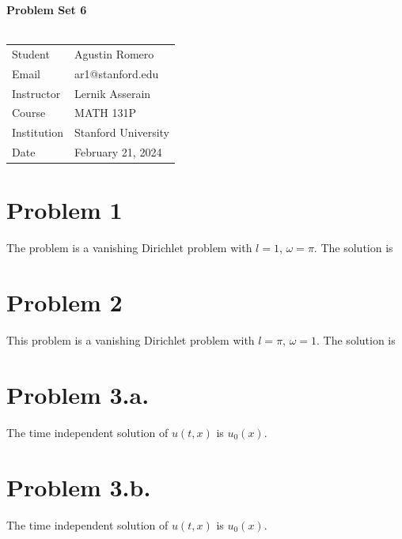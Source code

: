 \documentclass{article}
\begin{document}
\begin{center}
\textbf{\Large{Problem Set 6}}\\~\\
\begin{tabular}{l l}
Student&Agustin Romero\\
Email&ar1@stanford.edu\\
Instructor&Lernik Asserain\\
Course&MATH 131P\\
Institution&Stanford University\\
Date&February 21, 2024\\
\end{tabular}
\end{center}
\section*{Problem 1}
The problem is a vanishing Dirichlet problem with $l=1$, $\omega=\pi$.
The solution is
\section*{Problem 2}
This problem is a vanishing Dirichlet problem with $l=\pi$, $\omega=1$.
The solution is
\section*{Problem 3.a.}
The time independent solution of $u(t,x)$ is $u_0(x)$.
\section*{Problem 3.b.}
The time independent solution of $u(t,x)$ is $u_0(x)$.
\end{document}
